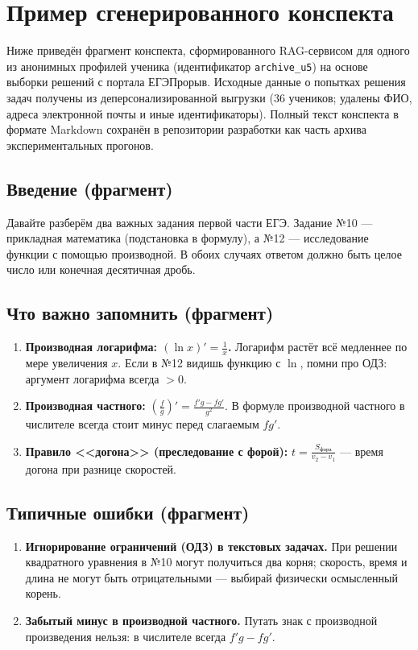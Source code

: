 \section{Пример сгенерированного конспекта}

Ниже приведён фрагмент конспекта, сформированного RAG-сервисом для одного из анонимных
профилей ученика (идентификатор \texttt{archive\_u5}) на основе выборки решений с портала
ЕГЭПрорыв. Исходные данные о попытках решения задач получены из деперсонализированной
выгрузки (36 учеников; удалены ФИО, адреса электронной почты и иные идентификаторы).
Полный текст конспекта в формате Markdown сохранён в репозитории разработки как часть
архива экспериментальных прогонов.

\subsection*{Введение (фрагмент)}

Давайте разберём два важных задания первой части ЕГЭ. Задание №10 --- прикладная математика
(подстановка в формулу), а №12 --- исследование функции с помощью производной. В обоих
случаях ответом должно быть целое число или конечная десятичная дробь.

\subsection*{Что важно запомнить (фрагмент)}

\begin{enumerate}
    \item \textbf{Производная логарифма: $(\ln x)' = \frac{1}{x}$.}
    Логарифм растёт всё медленнее по мере увеличения $x$. Если в №12 видишь функцию с $\ln$,
    помни про ОДЗ: аргумент логарифма всегда $> 0$.
    \item \textbf{Производная частного:}
    $\left(\frac{f}{g}\right)' = \frac{f'g - fg'}{g^2}$.
    В формуле производной частного в числителе всегда стоит минус перед слагаемым $fg'$.
    \item \textbf{Правило <<догона>> (преследование с форой):}
    $t = \frac{S_{\mathrm{фора}}}{v_2 - v_1}$ --- время догона при разнице скоростей.
\end{enumerate}

\subsection*{Типичные ошибки (фрагмент)}

\begin{enumerate}
    \item \textbf{Игнорирование ограничений (ОДЗ) в текстовых задачах.}
    При решении квадратного уравнения в №10 могут получиться два корня; скорость, время и длина
    не могут быть отрицательными --- выбирай физически осмысленный корень.
    \item \textbf{Забытый минус в производной частного.}
    Путать знак с производной произведения нельзя: в числителе всегда $f'g - fg'$.
\end{enumerate}

